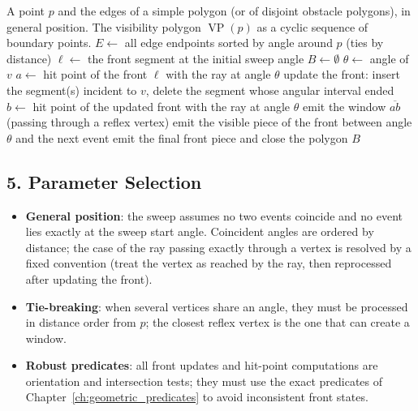 \begin{algorithm}[htbp]
\caption{Rotational Sweep for the Visibility Polygon}
\label{alg:vis_rotational_sweep}
\begin{algorithmic}[1]
\Require A point $p$ and the edges of a simple polygon (or of disjoint obstacle polygons), in general position.
\Ensure The visibility polygon $\operatorname{VP}(p)$ as a cyclic sequence of boundary points.
  \State $E \gets$ all edge endpoints sorted by angle around $p$ (ties by distance)
  \State $\ell \gets$ the front segment at the initial sweep angle
  \State $B \gets \emptyset$ 
    \State $\theta \gets$ angle of $v$
    \State $a \gets$ hit point of the front $\ell$ with the ray at angle $\theta$
    \State update the front: insert the segment(s) incident to $v$, delete the segment whose angular interval ended
    \State $b \gets$ hit point of the updated front with the ray at angle $\theta$
      \State emit the window $\overline{ab}$ (passing through a reflex vertex)
    \EndIf
    \State emit the visible piece of the front between angle $\theta$ and the next event
  \EndFor
  \State emit the final front piece and close the polygon
  \State \Return $B$
\EndFunction
\end{algorithmic}
\end{algorithm}

\subsection{5. Parameter Selection}

\begin{itemize}
\item \textbf{General position}: the sweep assumes no two events coincide
  and no event lies exactly at the sweep start angle. Coincident angles are
  ordered by distance; the case of the ray passing exactly through a vertex
  is resolved by a fixed convention (treat the vertex as reached by the ray,
  then reprocessed after updating the front).
\item \textbf{Tie-breaking}: when several vertices share an angle, they must
  be processed in distance order from $p$; the closest reflex vertex is the
  one that can create a window.
\item \textbf{Robust predicates}: all front updates and hit-point
  computations are orientation and intersection tests; they must use the
  exact predicates of Chapter~\ref{ch:geometric_predicates} to avoid
  inconsistent front states.
\end{itemize}

